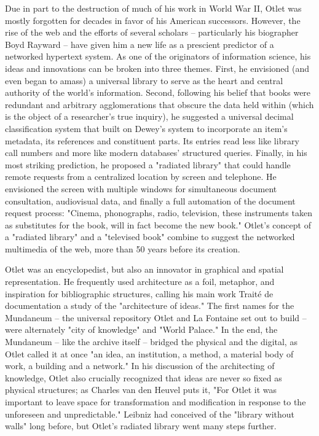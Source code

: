 Due in part to the destruction of much of his work in World War II, Otlet was mostly forgotten for decades in favor of his American successors. However, the rise of the web and the efforts of several scholars – particularly his biographer Boyd Rayward – have given him a new life as a prescient predictor of a networked hypertext system. As one of the originators of information science, his ideas and innovations can be broken into three themes. First, he envisioned (and even began to amass) a universal library to serve as the heart and central authority of the world's information. Second, following his belief that books were redundant and arbitrary agglomerations that obscure the data held within (which is the object of a researcher's true inquiry), he suggested a universal decimal classification system that built on Dewey's system to incorporate an item's metadata, its references and constituent parts. Its entries read less like library call numbers and more like modern databases' structured queries. Finally, in his most striking prediction, he proposed a "radiated library" that could handle remote requests from a centralized location by screen and telephone. He envisioned the screen with multiple windows for simultaneous document consultation, audiovisual data, and finally a full automation of the document request process: "Cinema, phonographs, radio, television, these instruments taken as substitutes for the book, will in fact become the new book."  Otlet's concept of a "radiated library" and a "televised book" combine to suggest the networked multimedia of the web, more than 50 years before its creation.

Otlet was an encyclopedist, but also an innovator in graphical and spatial representation. He frequently used architecture as a foil, metaphor, and inspiration for bibliographic structures, calling his main work Traité de documentation a study of the "architecture of ideas."  The first names for the Mundaneum – the universal repository Otlet and La Fontaine set out to build – were alternately "city of knowledge" and "World Palace." In the end, the Mundaneum – like the archive itself – bridged the physical and the digital, as Otlet called it at once "an idea, an institution, a method, a material body of work, a building and a network."  In his discussion of the architecting of knowledge, Otlet also crucially recognized that ideas are never so fixed as physical structures; as Charles van den Heuvel puts it, "For Otlet it was important to leave space for transformation and modification in response to the unforeseen and unpredictable."  Leibniz had conceived of the "library without walls" long before, but Otlet's radiated library went many steps further.

